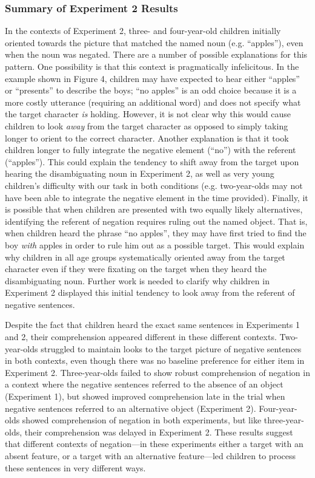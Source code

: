 \documentclass[man]{apa2}
\begin{document}
\subsubsection{Summary of Experiment 2 Results}
In the contexts of Experiment 2, three- and four-year-old children initially oriented towards the picture that matched the named noun (e.g. ``apples''), even when the noun was negated.  There are a number of possible explanations for this pattern.  One possibility is that this context is pragmatically infelicitous.  In the example shown in Figure 4, children may have expected to hear either ``apples'' or ``presents'' to describe the boys; ``no apples'' is an odd choice because it is a more costly utterance (requiring an additional word) and does not specify what the target character \emph{is} holding.  However, it is not clear why this would cause children to look \emph{away} from the target character as opposed to simply taking longer to orient to the correct character.  Another explanation is that it took children longer to fully integrate the negative element (``no'') with the referent (``apples'').  This could explain the tendency to shift away from the target upon hearing the disambiguating noun in Experiment 2, as well as very young children's difficulty with our task in both conditions (e.g. two-year-olds may not have been able to integrate the negative element in the time provided).  Finally, it is possible that when children are presented with two equally likely alternatives, identifying the referent of negation requires ruling out the named object.  That is, when children heard the phrase ``no apples'', they may have first tried to find the boy \emph{with} apples in order to rule him out as a possible target.  This would explain why children in all age groups systematically oriented away from the target character even if they were fixating on the target when they heard the disambiguating noun.  Further work is needed to clarify why children in Experiment 2 displayed this initial tendency to look away from the referent of negative sentences.  

Despite the fact that children heard the exact same sentences in Experiments 1 and 2, their comprehension appeared different in these different contexts.  Two-year-olds struggled to maintain looks to the target picture of negative sentences in both contexts, even though there was no baseline preference for either item in Experiment 2.  Three-year-olds failed to show robust comprehension of negation in a context where the negative sentences referred to the absence of an object (Experiment 1), but showed improved comprehension late in the trial when negative sentences referred to an alternative object (Experiment 2).  Four-year-olds showed comprehension of negation in both experiments, but like three-year-olds, their comprehension was delayed in Experiment 2.  These results suggest that different contexts of negation---in these experiments either a target with an absent feature, or a target with an alternative feature---led children to process these sentences in very different ways.  
\end{document}
